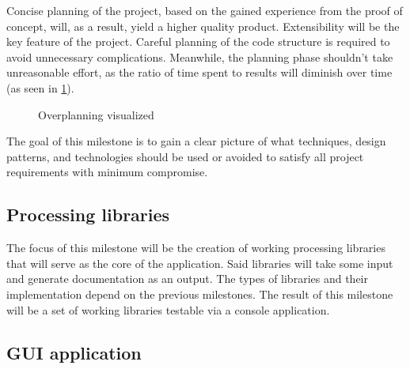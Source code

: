 Concise planning of the project, based on the gained experience from the proof of concept, will, as a result, yield a higher quality product.
Extensibility will be the key feature of the project. Careful planning of the code structure is required to avoid unnecessary complications.
Meanwhile, the planning phase shouldn't take unreasonable effort, as the ratio of time spent to results will diminish over time (as seen in \ref{fig:overplanning}). \cite{ruparelia_stop_2016}

\begin{figure}[H]
    \centering
    \caption{Overplanning visualized}
    \label{fig:overplanning}
\end{figure}

The goal of this milestone is to gain a clear picture of what techniques, design patterns, and technologies should be used or avoided to satisfy all project requirements with minimum compromise.

\subsection*{Processing libraries} \label{subSecProcessingLibs}

The focus of this milestone will be the creation of working processing libraries that will serve as the core of the application. Said libraries will take some input and generate documentation as an output. The types of libraries and their implementation depend on the previous milestones. The result of this milestone will be a set of working libraries testable via a console application.

\subsection*{GUI application} \label{subSecGuiApp}


